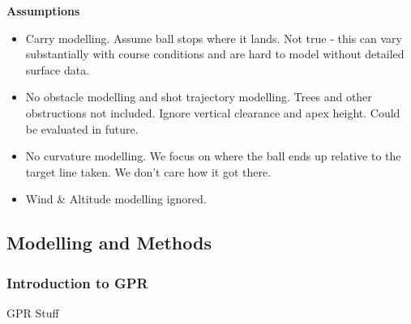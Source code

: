 \documentclass[11pt, letterpaper]{article}
\begin{document}
\textbf{Assumptions}
\begin{itemize}
    \item Carry modelling. Assume ball stops where it lands. Not true - this can vary substantially with course conditions and are hard to model without detailed surface data.
    \item No obstacle modelling and shot trajectory modelling. Trees and other obstructions not included. Ignore vertical clearance and apex height. Could be evaluated in future.
    \item No curvature modelling. We focus on where the ball ends up relative to the target line taken. We don't care how it got there.
    \item Wind \& Altitude modelling ignored.
\end{itemize}

\subsection{Modelling and Methods}

\subsubsection{Introduction to GPR}
GPR Stuff
\end{document}
